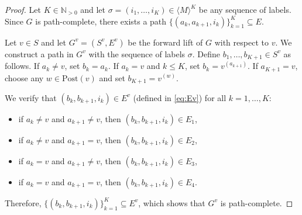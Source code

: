 \documentclass[letterpaper, 10 pt, conference]{ieeeconf}  %
\newcommand{\Mset}{\langle M\rangle}
\begin{document}
\begin{proof}
Let $K\in \mathbb N_{>0}$ and let $\sigma=(i_1,\ldots,i_K)\in \Mset^K$ be any sequence of labels. Since $G$ is path-complete, there exists a path $\{(a_k,a_{k+1},i_k)\}_{k=1}^K \subseteq E$.

Let $v\in S$ and let $G^v=(S^v,E^v)$ be the forward lift of $G$ with respect to $v$. We construct a path in $G^v$ with the sequence of labels $\sigma$. Define $b_1,\ldots,b_{K+1}\in S^v$ as follows. 
If $a_k\neq v$, set $b_k=a_k$. If $a_k=v$ and $k\le K$, set $b_k=v^{(a_{k+1})}$. 
If $a_{K+1}=v$, choose any $w\in\mathrm{Post}(v)$ and set $b_{K+1}=v^{(w)}$.

We verify that $(b_k,b_{k+1},i_k)\in E^v$ (defined in \eqref{eq:Ev}) for all $k=1,\ldots,K$:
\begin{itemize}
\item if $a_k\neq v$ and $a_{k+1}\neq v$, then $(b_k,b_{k+1},i_k)\in E_1$,
\item if $a_k\neq v$ and $a_{k+1}=v$, then $(b_k,b_{k+1},i_k)\in E_2$,
\item if $a_k=v$ and $a_{k+1}\neq v$, then $(b_k,b_{k+1},i_k)\in E_3$,
\item if $a_k=v$ and $a_{k+1}=v$, then $(b_k,b_{k+1},i_k)\in E_4$.
\end{itemize}

Therefore, $\{(b_k,b_{k+1},i_k)\}_{k=1}^K \subseteq E^v$, which shows that $G^v$ is path-complete.
\end{proof}
\fi
\end{document}
